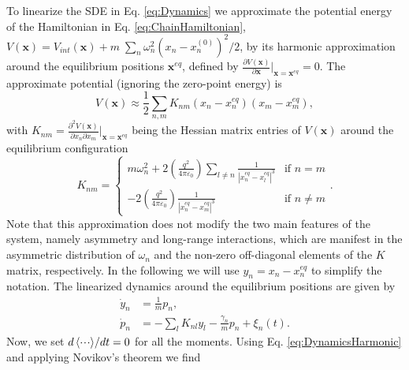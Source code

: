 To linearize the SDE in Eq. \eqref{eq:Dynamics} we approximate the potential energy of the Hamiltonian in Eq. \eqref{eq:ChainHamiltonian}, $V(\bm{x}) = V_{int}(\bm{x}) + m\;\sum_n \omega_n^2 (x_n-x_n^{(0)})^2/2$, by its harmonic approximation around the equilibrium positions $\bm{x}^{eq}$, defined by  $\frac{\partial V(\bm{x})}{\partial\bm{x}}\Big|_{\bm{x}=\bm{x}^{eq}} = 0$. The approximate potential (ignoring the zero-point energy) is
%
\begin{equation}
    V(\bm{x})\approx  \frac{1}{2} \sum_{n,m} K_{nm} (x_n-x_n^{eq})(x_m-x_m^{eq}),
\end{equation}
%
with $K_{nm} = \frac{\partial^2 V(\bm{x})}{\partial x_n \partial x_m}\Big|_{\bm{x}=\bm{x}^{eq}}$ being the Hessian matrix entries of $V(\bm{x})$ around the equilibrium configuration \cite{James1998}
%
\begin{equation}
    K_{nm} =
    \begin{cases}
        m \omega_n^2 + 2 \left(\frac{q^2}{4\pi\varepsilon_0}\right) \sum_{l \neq n  }\frac{1}{\left|x_n^{eq}-x_l^{eq}\right|^3} & \text{if  } n=m\\

         - 2 \left(\frac{q^2}{4\pi\varepsilon_0}\right) \frac{1}{\left|x_n^{eq}-x_m^{eq}\right|^3} & \text{if  } n \neq m
    \end{cases}.
\end{equation}
%
Note that this approximation does not modify the two main features of the system, namely asymmetry and long-range interactions, which are manifest in the asymmetric distribution of $\omega_n$ and the non-zero off-diagonal elements of the $K$ matrix, respectively. In the following we will use $y_n=x_n-x_n^{eq}$ to simplify the notation. The linearized dynamics around the equilibrium positions are given by
%
\begin{equation}
    \begin{split}
        \dot{y}_n &= \frac{1}{m}p_n,\\
        \dot{p}_n &= -\sum_{l}K_{nl}y_l- \frac{\gamma_n}{m}p_n + \xi_n(t).
    \end{split}
    \label{eq:DynamicsHarmonic}
\end{equation}
%
Now, we set ${d\expval{\cdot\!\cdot\!\cdot}}/{dt} = 0$ for all the moments. Using Eq. \eqref{eq:DynamicsHarmonic} and applying Novikov's theorem we find
%
